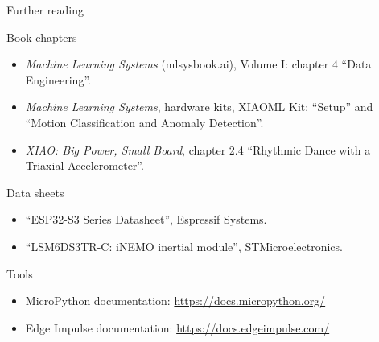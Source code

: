 \begin{frame}{Further reading}
  \footnotesize
  \begin{block}{Book chapters}
    \begin{itemize}
      \item \emph{Machine Learning Systems} (mlsysbook.ai), Volume I:
            chapter 4 ``Data Engineering''.
      \item \emph{Machine Learning Systems}, hardware kits, XIAOML Kit:
            ``Setup'' and ``Motion Classification and Anomaly Detection''.
      \item \emph{XIAO: Big Power, Small Board}, chapter 2.4 ``Rhythmic
            Dance with a Triaxial Accelerometer''.
    \end{itemize}
  \end{block}
  \begin{block}{Data sheets}
    \begin{itemize}
      \item ``ESP32-S3 Series Datasheet'', Espressif Systems.
      \item ``LSM6DS3TR-C: iNEMO inertial module'', STMicroelectronics.
    \end{itemize}
  \end{block}
  \begin{block}{Tools}
    \begin{itemize}
      \item MicroPython documentation: \url{https://docs.micropython.org/}
      \item Edge Impulse documentation: \url{https://docs.edgeimpulse.com/}
    \end{itemize}
  \end{block}
\end{frame}
